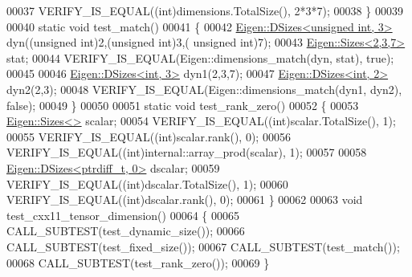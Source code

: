 \begin{DoxyCode}
00037   VERIFY\_IS\_EQUAL((\textcolor{keywordtype}{int})dimensions.TotalSize(), 2*3*7);
00038 \}
00039 
00040 \textcolor{keyword}{static} \textcolor{keywordtype}{void} test\_match()
00041 \{
00042   \hyperlink{struct_eigen_1_1_d_sizes}{Eigen::DSizes<unsigned int, 3>} dyn((\textcolor{keywordtype}{unsigned} \textcolor{keywordtype}{int})2,(\textcolor{keywordtype}{unsigned} \textcolor{keywordtype}{int})3,(\textcolor{keywordtype}{
      unsigned} \textcolor{keywordtype}{int})7);
00043   \hyperlink{struct_eigen_1_1_sizes}{Eigen::Sizes<2,3,7>} stat;
00044   VERIFY\_IS\_EQUAL(Eigen::dimensions\_match(dyn, stat), \textcolor{keyword}{true});
00045 
00046   \hyperlink{struct_eigen_1_1_d_sizes}{Eigen::DSizes<int, 3>} dyn1(2,3,7);
00047   \hyperlink{struct_eigen_1_1_d_sizes}{Eigen::DSizes<int, 2>} dyn2(2,3);
00048   VERIFY\_IS\_EQUAL(Eigen::dimensions\_match(dyn1, dyn2), \textcolor{keyword}{false});
00049 \}
00050 
00051 \textcolor{keyword}{static} \textcolor{keywordtype}{void} test\_rank\_zero()
00052 \{
00053   \hyperlink{struct_eigen_1_1_sizes}{Eigen::Sizes<>} scalar;
00054   VERIFY\_IS\_EQUAL((\textcolor{keywordtype}{int})scalar.TotalSize(), 1);
00055   VERIFY\_IS\_EQUAL((\textcolor{keywordtype}{int})scalar.rank(), 0);
00056   VERIFY\_IS\_EQUAL((\textcolor{keywordtype}{int})internal::array\_prod(scalar), 1);
00057 
00058   \hyperlink{struct_eigen_1_1_d_sizes}{Eigen::DSizes<ptrdiff\_t, 0>} dscalar;
00059   VERIFY\_IS\_EQUAL((\textcolor{keywordtype}{int})dscalar.TotalSize(), 1);
00060   VERIFY\_IS\_EQUAL((\textcolor{keywordtype}{int})dscalar.rank(), 0);
00061 \}
00062 
00063 \textcolor{keywordtype}{void} test\_cxx11\_tensor\_dimension()
00064 \{
00065   CALL\_SUBTEST(test\_dynamic\_size());
00066   CALL\_SUBTEST(test\_fixed\_size());
00067   CALL\_SUBTEST(test\_match());
00068   CALL\_SUBTEST(test\_rank\_zero());
00069 \}
\end{DoxyCode}
